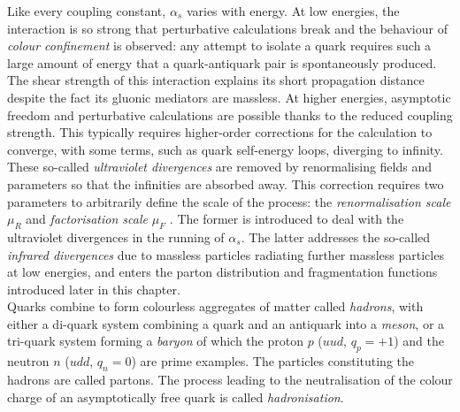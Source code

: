 Like every coupling constant, $\alpha_s$ varies with energy. At low energies, the interaction is so strong that perturbative calculations break and the behaviour of \textit{colour confinement} is observed: any attempt to isolate a quark requires such a large amount of energy that a quark-antiquark pair is spontaneously produced. The shear strength of this interaction explains its short propagation distance despite the fact its gluonic mediators are massless. At higher energies, asymptotic freedom and perturbative calculations are possible thanks to the reduced coupling strength. This typically requires higher-order corrections for the calculation to converge, with some terms, such as quark self-energy loops, diverging to infinity. These so-called \textit{ultraviolet divergences} are removed by renormalising fields and parameters so that the infinities are absorbed away. This correction requires two parameters to arbitrarily define the scale of the process: the \textit{renormalisation scale} $\mu_R$ and \textit{factorisation scale} $\mu_F$ \cite{collins2004factorization}. The former is introduced to deal with the ultraviolet divergences in the running of $\alpha_s$. The latter addresses the so-called \textit{infrared divergences} due to massless particles radiating further massless particles at low energies, and enters the parton distribution and fragmentation functions introduced later in this chapter.\\

Quarks combine to form colourless aggregates of matter called \textit{hadrons}, with either a di-quark system combining a quark and an antiquark into a \textit{meson}, or a tri-quark system forming a \textit{baryon} of which the proton $p$ ($uud$, $q_p = +1$) and the neutron $n$ ($udd$, $q_n = 0$) are prime examples. The particles constituting the hadrons are called partons. The process leading to the neutralisation of the colour charge of an asymptotically free quark is called \textit{hadronisation}.


